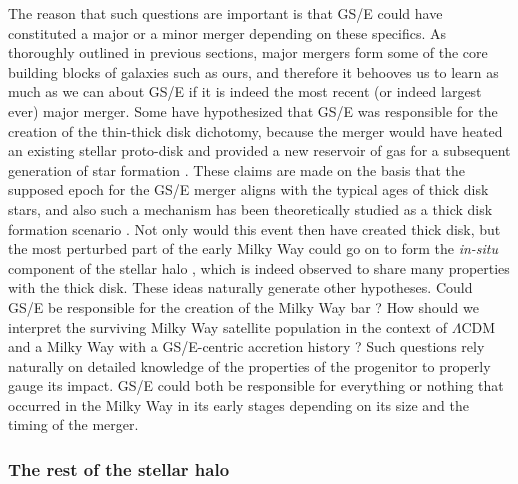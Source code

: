 The reason that such questions are important is that GS/E could have constituted a major or a minor merger depending on these specifics. As thoroughly outlined in previous sections, major mergers form some of the core building blocks of galaxies such as ours, and therefore it behooves us to learn as much as we can about GS/E if it is indeed the most recent (or indeed largest ever) major merger. Some have hypothesized that GS/E was responsible for the creation of the thin-thick disk dichotomy, because the merger would have heated an existing stellar proto-disk and provided a new reservoir of gas for a subsequent generation of star formation \parencite{helmi18,gallart19}. These claims are made on the basis that the supposed epoch for the GS/E merger aligns with the typical ages of thick disk stars, and also such a mechanism has been theoretically studied as a thick disk formation scenario \parencite[e.g.][]{quinn93,purcell10}. Not only would this event then have created thick disk, but the most perturbed part of the early Milky Way could go on to form the \textit{in-situ} component of the stellar halo \parencite{haywood18,dimatteo19,belokurov20}, which is indeed observed to share many properties with the thick disk. These ideas naturally generate other hypotheses. Could GS/E be responsible for the creation of the Milky Way bar \parencite[e.g.][]{fragkoudi20}? How should we interpret the surviving Milky Way satellite population in the context of $\Lambda$CDM and a Milky Way with a GS/E-centric accretion history \parencite{bose20}? Such questions rely naturally on detailed knowledge of the properties of the progenitor to properly gauge its impact. GS/E could both be responsible for everything or nothing that occurred in the Milky Way in its early stages depending on its size and the timing of the merger.

\subsubsection{The rest of the stellar halo}

